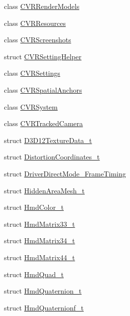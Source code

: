 \begin{DoxyCompactItemize}
class \mbox{\hyperlink{class_valve_1_1_v_r_1_1_c_v_r_render_models}{C\+V\+R\+Render\+Models}}
\item 
class \mbox{\hyperlink{class_valve_1_1_v_r_1_1_c_v_r_resources}{C\+V\+R\+Resources}}
\item 
class \mbox{\hyperlink{class_valve_1_1_v_r_1_1_c_v_r_screenshots}{C\+V\+R\+Screenshots}}
\item 
struct \mbox{\hyperlink{struct_valve_1_1_v_r_1_1_c_v_r_setting_helper}{C\+V\+R\+Setting\+Helper}}
\item 
class \mbox{\hyperlink{class_valve_1_1_v_r_1_1_c_v_r_settings}{C\+V\+R\+Settings}}
\item 
class \mbox{\hyperlink{class_valve_1_1_v_r_1_1_c_v_r_spatial_anchors}{C\+V\+R\+Spatial\+Anchors}}
\item 
class \mbox{\hyperlink{class_valve_1_1_v_r_1_1_c_v_r_system}{C\+V\+R\+System}}
\item 
class \mbox{\hyperlink{class_valve_1_1_v_r_1_1_c_v_r_tracked_camera}{C\+V\+R\+Tracked\+Camera}}
\item 
struct \mbox{\hyperlink{struct_valve_1_1_v_r_1_1_d3_d12_texture_data__t}{D3\+D12\+Texture\+Data\+\_\+t}}
\item 
struct \mbox{\hyperlink{struct_valve_1_1_v_r_1_1_distortion_coordinates__t}{Distortion\+Coordinates\+\_\+t}}
\item 
struct \mbox{\hyperlink{struct_valve_1_1_v_r_1_1_driver_direct_mode___frame_timing}{Driver\+Direct\+Mode\+\_\+\+Frame\+Timing}}
\item 
struct \mbox{\hyperlink{struct_valve_1_1_v_r_1_1_hidden_area_mesh__t}{Hidden\+Area\+Mesh\+\_\+t}}
\item 
struct \mbox{\hyperlink{struct_valve_1_1_v_r_1_1_hmd_color__t}{Hmd\+Color\+\_\+t}}
\item 
struct \mbox{\hyperlink{struct_valve_1_1_v_r_1_1_hmd_matrix33__t}{Hmd\+Matrix33\+\_\+t}}
\item 
struct \mbox{\hyperlink{struct_valve_1_1_v_r_1_1_hmd_matrix34__t}{Hmd\+Matrix34\+\_\+t}}
\item 
struct \mbox{\hyperlink{struct_valve_1_1_v_r_1_1_hmd_matrix44__t}{Hmd\+Matrix44\+\_\+t}}
\item 
struct \mbox{\hyperlink{struct_valve_1_1_v_r_1_1_hmd_quad__t}{Hmd\+Quad\+\_\+t}}
\item 
struct \mbox{\hyperlink{struct_valve_1_1_v_r_1_1_hmd_quaternion__t}{Hmd\+Quaternion\+\_\+t}}
\item 
struct \mbox{\hyperlink{struct_valve_1_1_v_r_1_1_hmd_quaternionf__t}{Hmd\+Quaternionf\+\_\+t}}

\end{DoxyCompactItemize}
